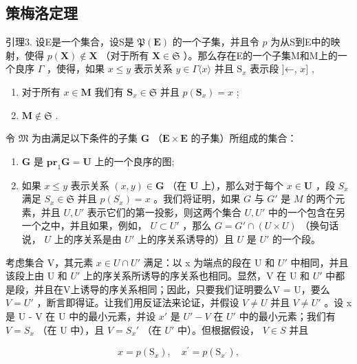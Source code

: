 \subsection{策梅洛定理}

引理3. 设E是一个集合，设S是 \(\mathfrak{P}(\mathbf{E})\) 的一个子集，并且令 \(p\) 为从S到E中的映射，使得 \(p(\mathbf{X}) \notin \mathbf{X}\) （对于所有 \(\mathbf{X} \in \mathfrak{S}\) ）。那么存在E的一个子集M和M上的一个良序 \(\Gamma\) ，使得，如果 \(x \leqslant y\) 表示关系 \(y \in \Gamma\langle x \rangle\) 并且 \(\mathrm{S}_x\) 表示段 {]}←, \(x]\) ,

\begin{enumerate}
\def\labelenumi{(\arabic{enumi})}
\item
  对于所有 \(x \in \mathbf{M}\) 我们有 \(\mathbf{S}_x \in \mathfrak{S}\) 并且 \(p(\mathbf{S}_x) = x\) ;
\item
  \(\mathbf{M} \notin \mathfrak{S}\) .
\end{enumerate}

令 \(\mathfrak{M}\) 为由满足以下条件的子集 \(\mathbf{G}\) （\(\mathbf{E} \times \mathbf{E}\) 的子集）所组成的集合：

\begin{enumerate}
\def\labelenumi{(\alph{enumi})}
\item
  \(\mathbf{G}\) 是 \(\mathbf{pr}_1\mathbf{G} = \mathbf{U}\) 上的一个良序的图;
\item
  如果 \(x \leqslant y\) 表示关系 \((x, y) \in \mathbf{G}\) （在 \(\mathbf{U}\) 上），那么对于每个 \(x \in \mathbf{U}\) ，段 \(S_x\) 满足 \(S_x \in \mathfrak{S}\) 并且 \(p(S_x) = x\) 。我们将证明，如果 \(G\) 与 \(G'\) 是 \(M\) 的两个元素，并且 \(U, U'\) 表示它们的第一投影，则这两个集合 \(U, U'\) 中的一个包含在另一个之中，并且如果，例如， \(U \subset U'\) ，那么 \(G = G' \cap (U \times U)\) （换句话说， \(U\) 上的序关系是由 \(U'\) 上的序关系诱导的）且 \(U\) 是 \(U'\) 的一个段。
\end{enumerate}

考虑集合 V，其元素 \(x \in U \cap U'\) 满足：以 x 为端点的段在 U 和 \(U'\) 中相同，并且该段上由 U 和 \(U'\) 上的序关系所诱导的序关系也相同。显然，V 在 U 和 \(U'\) 中都是段，并且在V上诱导的序关系相同；因此，只要我们证明要么V = U，要么 \(V = U'\) ，断言即得证。让我们用反证法来论证，并假设 \(V \neq U\) 并且 \(V \neq U'\) 。设 x 是 U - V 在 U 中的最小元素，并设 \(x'\) 是 \(U' - V\) 在 \(U'\) 中的最小元素；我们有 \(V = S_x\) （在 U 中），且 \(V = S_x'\) （在 \(U'\) 中）。但根据假设， \(V \in S\) 并且

\[
x = p \left(\mathrm{S} _ {x}\right), \quad x ^ {\prime} = p \left(\mathrm{S} _ {x ^ {\prime}}\right),
\]

